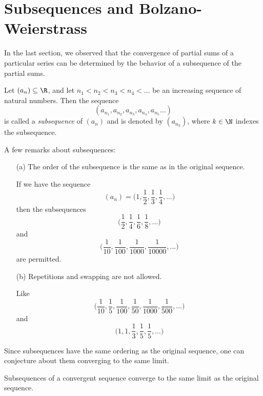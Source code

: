 \section{Subsequences and Bolzano-Weierstrass}

In the last section, we observed that the convergence of partial sums of a particular series can be determined by the behavior of a subsequence of the partial sums. 

\begin{tcolorbox}
\begin{defn}
Let \( (a_n) \subseteq \R \), and let \( n_1 < n_2 < n_3 < n_4 < \dots\) be an increasing sequence of natural numbers. Then the sequence 
\[ (a_{n_1}, a_{n_2}, a_{n_3}, a_{n_4}, a_{n_5} \dots)\]
is called a \textit{subsequence} of \( (a_n)\) and is denoted by \( (a_{n_k})\), where \( k \in \N \) indexes the subsequence.
\end{defn}
\end{tcolorbox} 

A few remarks about subsequences: 

\begin{enumerate}
    \item[(a)] The order of the subsequence is the same as in the original sequence.
        \begin{ex}
        If we have the sequence  
        \[ (a_n) = \Big( 1, \frac{1}{2}, \frac{1}{3}, \frac{1}{4}, ...\Big)\]
        then the subsequences 
        \[ \Big( \frac{1}{2}, \frac{1}{4}, \frac{1}{6}, \frac{1}{8},... \Big)\]
        and 
        \[ \Big( \frac{1}{10}, \frac{1}{100}, \frac{1}{1000}, \frac{1}{10000}, ...\Big)\]
        are permitted.
        \end{ex}
        
    \item[(b)] Repetitions and swapping are not allowed.
        \begin{ex}
        Like 
        \[ \Big( \frac{1}{10}, \frac{1}{5}, \frac{1}{100}, \frac{1}{50}, \frac{1}{1000}, \frac{1}{500},...\Big)\] 
        and 
        \[ \Big( 1,1, \frac{1}{3}, \frac{1}{5}, \frac{1}{5}, ...\Big)\]
        \end{ex}
        
\end{enumerate}

Since subsequences have the same ordering as the original sequence, one can conjecture about them converging to the same limit. 

\begin{tcolorbox}
\begin{thm}
Subsequences of a convergent sequence converge to the same limit as the original sequence.
\end{thm}
\end{tcolorbox}

